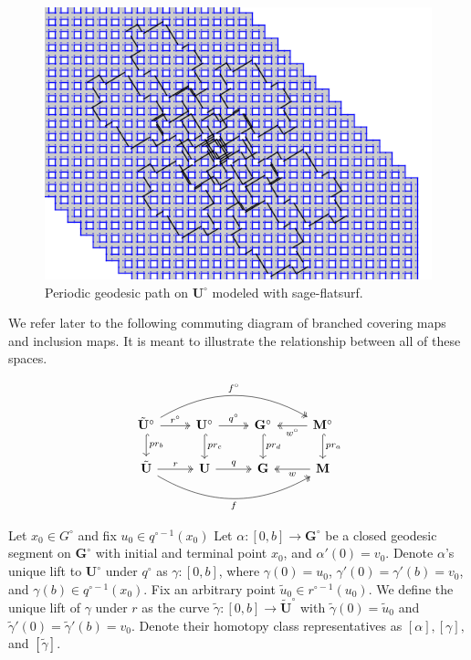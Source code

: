 \documentclass[]{article}
\def\bU{\mathbf{U}} \def\btU{\tilde{\bU}} \def\bUs{\bU^\circ}
\def\bG{\mathbf{G}} \def\bGs{\mathbf{G}^\circ}
\def\bM{\mathbf{M}}
\def\bMs{\mathbf{M}^\circ}
\def\btUs{\btU^\circ}
\def\utild{\tilde{u}_0}
\begin{document}
\begin{figure}[H]
\centering
\includegraphics[width=4in.]{closed2.png}
\caption{Periodic geodesic path on $\bUs$ modeled with sage-flatsurf.}
\label{fig:complicated}
\end{figure}

We refer later to the following commuting diagram of branched covering maps and inclusion maps. It is meant to illustrate the relationship between all of these spaces.

\begin{equation}
\begin{tikzcd}
\arrow[two heads, bend left]{rrr}{f^\circ}[swap]{} \arrow[hook]{d}{pr_b} \btUs \arrow[two heads]{r}{r^\circ} & \bUs \arrow[hook]{d}{pr_c} \arrow[two heads]{r}{q^\circ} & \bGs \arrow[hook]{d}{pr_d} &\arrow[two heads]{l}{w^\circ} \bMs \arrow[hook]{d}{pr_a}  \\
\arrow[two heads, bend right]{rrr}{}[swap]{f} \btU \arrow[two heads]{r}{r} & \bU \arrow[two heads]{r}{q} & \bG & \arrow[two heads]{l}{w}\bM  \\
\end{tikzcd}
\label{eq:commute}
\end{equation}



Let $x_0\in G^\circ$ and fix $u_0\in q^{\circ-1}(x_0)$ Let $\alpha:[0,b]\rightarrow\bGs$ be a closed geodesic segment on $\bGs$ with initial and terminal point $x_0$, and $\alpha'(0)=v_0$. Denote $\alpha$'s unique lift to $\bUs$ under $q^\circ$ as $\gamma:[0,b]$, where $\gamma(0)=u_0$, $\gamma'(0)=\gamma'(b)=v_0$, and $\gamma(b)\in q^{\circ-1}(x_0)$. Fix an arbitrary point $\utild\in r^{\circ -1}(u_0)$. We define the unique lift of $\gamma$ under $r$ as the curve $\tilde{\gamma}:[0,b]\rightarrow\btUs$ with $\tilde{\gamma}(0)=\utild$ and $\tilde{\gamma}'(0)=\tilde{\gamma}'(b)=v_0$. Denote their homotopy class representatives as $[\alpha],[\gamma],$ and $[\tilde{\gamma}]$.
\end{document}
